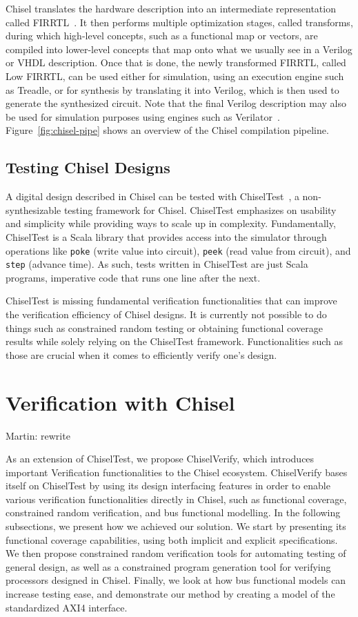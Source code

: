 \documentclass[conference]{IEEEtran}
\newcommand{\martin}[1]{{\color{blue} Martin: #1}}
\begin{document}
Chisel translates the hardware description into an intermediate representation called FIRRTL~\cite{firrtl}. 
It then performs multiple optimization stages, called transforms, during which high-level concepts, such as a functional map or vectors, are compiled into lower-level concepts that map onto what we usually see in a Verilog or VHDL description. 
Once that is done, the newly transformed FIRRTL, called Low FIRRTL, can be used either for simulation, using an execution engine such as Treadle, or for synthesis by translating it into Verilog, which is then used to generate the synthesized circuit. 
Note that the final Verilog description may also be used for simulation purposes using engines such as Verilator~\cite{verilator}. 
Figure~\ref{fig:chisel-pipe} shows an overview of the Chisel compilation pipeline.

\subsection{Testing Chisel Designs}
A digital design described in Chisel can be tested with ChiselTest~\cite{chisel:tester2}, a non-synthesizable testing framework for Chisel.
ChiselTest emphasizes on usability and simplicity while providing ways to scale up in complexity.
Fundamentally, ChiselTest is a Scala library that provides access into the simulator through
operations like \texttt{poke} (write value into circuit), \texttt{peek} (read value from circuit), and \texttt{step} (advance time).
As such, tests written in ChiselTest are just Scala programs, imperative code that runs one line after the next.

ChiselTest is missing fundamental verification functionalities that can improve the verification efficiency of Chisel designs. 
It is currently not possible to do things such as constrained random testing or obtaining functional coverage results while solely relying on the ChiselTest framework. 
Functionalities such as those are crucial when it comes to efficiently verify one's design.

\section{Verification with Chisel}

\martin{rewrite}

As an extension of ChiselTest, we propose ChiselVerify, which introduces important Verification functionalities to the Chisel ecosystem.
ChiselVerify bases itself on ChiselTest by using its design interfacing features in order to enable various verification functionalities directly in Chisel, such as functional coverage, constrained random verification, and bus functional modelling. 
In the following subsections, we present how we achieved our solution.
We start by presenting its functional coverage capabilities,  using both implicit and explicit specifications.
We then propose constrained random verification tools for automating testing of general design, as well as a constrained program generation tool for verifying processors designed in Chisel.
Finally, we look at how bus functional models can increase testing ease, and demonstrate our method by creating a model of the standardized AXI4 interface. 
\end{document}
